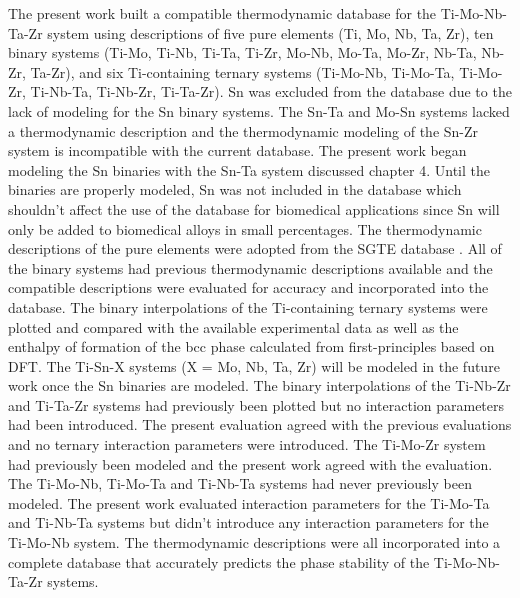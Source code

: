 The present work built a compatible thermodynamic database for the Ti-Mo-Nb-Ta-Zr system using descriptions of five pure elements (Ti, Mo, Nb, Ta, Zr), ten binary systems (Ti-Mo, Ti-Nb, Ti-Ta, Ti-Zr, Mo-Nb, Mo-Ta, Mo-Zr, Nb-Ta, Nb-Zr, Ta-Zr), and six Ti-containing ternary systems (Ti-Mo-Nb, Ti-Mo-Ta, Ti-Mo-Zr, Ti-Nb-Ta, Ti-Nb-Zr, Ti-Ta-Zr). Sn was excluded from the database due to the lack of modeling for the Sn binary systems. The Sn-Ta and Mo-Sn systems lacked a thermodynamic description and the thermodynamic modeling of the Sn-Zr system is incompatible with the current database. The present work began modeling the Sn binaries with the Sn-Ta system discussed chapter 4. Until the binaries are properly modeled, Sn was not included in the database which shouldn't affect the use of the database for biomedical applications since Sn will only be added to biomedical alloys in small percentages. The thermodynamic descriptions of the pure elements were adopted from the SGTE database \cite{Dinsdale1991}. All of the binary systems had previous thermodynamic descriptions available and the compatible descriptions were evaluated for accuracy and incorporated into the database. The binary interpolations of the Ti-containing ternary systems were plotted and compared with the available experimental data as well as the enthalpy of formation of the bcc phase calculated from first-principles based on DFT. The Ti-Sn-X systems (X = Mo, Nb, Ta, Zr) will be modeled in the future work once the Sn binaries are modeled. The binary interpolations of the Ti-Nb-Zr and Ti-Ta-Zr systems had previously been plotted but no interaction parameters had been introduced. The present evaluation agreed with the previous evaluations and no ternary interaction parameters were introduced. The Ti-Mo-Zr system had previously been modeled and the present work agreed with the evaluation. The Ti-Mo-Nb, Ti-Mo-Ta and Ti-Nb-Ta systems had never previously been modeled. The present work evaluated interaction parameters for the Ti-Mo-Ta and Ti-Nb-Ta systems but didn't introduce any interaction parameters for the Ti-Mo-Nb system. The thermodynamic descriptions were all incorporated into a complete database that accurately predicts the phase stability of the Ti-Mo-Nb-Ta-Zr systems.


